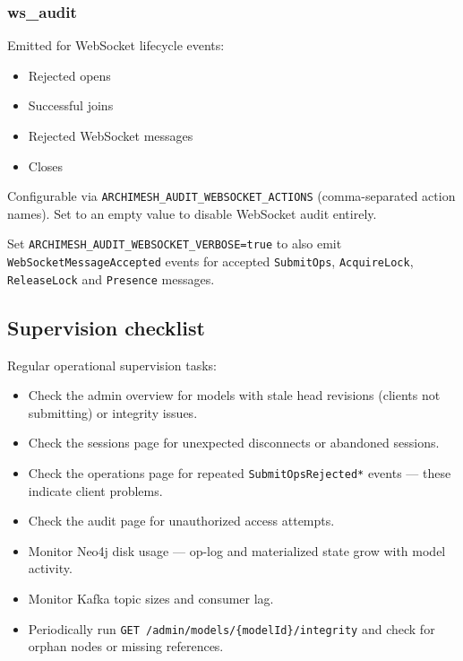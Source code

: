\subsubsection{ws\_audit}

Emitted for WebSocket lifecycle events:

\begin{itemize}
\item Rejected opens
\item Successful joins
\item Rejected WebSocket messages
\item Closes
\end{itemize}

Configurable via \texttt{ARCHIMESH\_AUDIT\_WEBSOCKET\_ACTIONS} (comma-separated
action names). Set to an empty value to disable WebSocket audit entirely.

Set \texttt{ARCHIMESH\_AUDIT\_WEBSOCKET\_VERBOSE=true} to also emit
\texttt{WebSocketMessageAccepted} events for accepted
\texttt{SubmitOps}, \texttt{AcquireLock}, \texttt{ReleaseLock} and
\texttt{Presence} messages.

\subsection{Supervision checklist}

Regular operational supervision tasks:

\begin{itemize}
\item Check the admin overview for models with stale head revisions (clients
  not submitting) or integrity issues.
\item Check the sessions page for unexpected disconnects or abandoned
  sessions.
\item Check the operations page for repeated \texttt{SubmitOpsRejected*}
  events --- these indicate client problems.
\item Check the audit page for unauthorized access attempts.
\item Monitor Neo4j disk usage --- op-log and materialized state grow with
  model activity.
\item Monitor Kafka topic sizes and consumer lag.
\item Periodically run \texttt{GET /admin/models/\{modelId\}/integrity} and
  check for orphan nodes or missing references.
\end{itemize}
